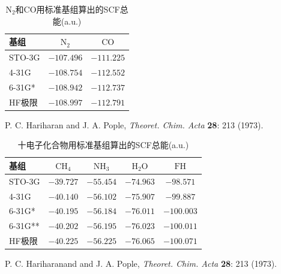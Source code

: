 \begin{table}\centering
	\caption{$\mathrm{N_2}$和$\mathrm{CO}$用标准基组算出的SCF总能(a.u.)}
	\begin{threeparttable}
		\begin{tabular}{l@{\hspace{1.5cm}}c@{\hspace{1.5cm}}c}
			\hline 基组 & $\mathrm{N}_2$ & $\mathrm{CO}$ \\
			\hline STO-3G & $-107.496$ & $-111.225$ \\
			4-31G & $-108.754$ & $-112.552$ \\
			6-31G* & $-108.942$ & $-112.737$ \\
			HF极限\tnote{a} & $-108.997$ & $-112.791$ \\
			\hline
		\end{tabular}
		\begin{tablenotes}
			\item[a] P. C. Hariharan and J. A. Pople, \textit{Theoret. Chim. Acta} \textbf{28}: 213 (1973).
		\end{tablenotes}
	\end{threeparttable}
	\label{tab:3.12}
\end{table}

\begin{table}\centering
	\caption{十电子化合物用标准基组算出的SCF总能(a.u.)}
	\begin{threeparttable}
		\begin{tabular}{lcccc}
			\hline 基组 & $\mathrm{CH}_4$ & $\mathrm{NH}_3$ & $\mathrm{H}_2 \mathrm{O}$ & $\mathrm{FH}$ \\
			\hline STO-3G & $-39.727$ & $-55.454$ & $-74.963$ & $-98.571$ \\
			4-31G & $-40.140$ & $-56.102$ & $-75.907$ & $-99.887$ \\
			6-31G* & $-40.195$ & $-56.184$ & $-76.011$ & $-100.003$ \\
			6-31G** & $-40.202$ & $-56.195$ & $-76.023$ & $-100.011$ \\
			HF极限\tnote{a} & $-40.225$ & $-56.225$ & $-76.065$ & $-100.071$ \\
			\hline
		\end{tabular}
		\begin{tablenotes}
			\item[a] P. C. Hariharanand and J. A. Pople, \textit{Theoret. Chim. Acta} \textbf{28}: 213 (1973).
		\end{tablenotes}
	\end{threeparttable}
	\label{tab:3.13}
\end{table}

